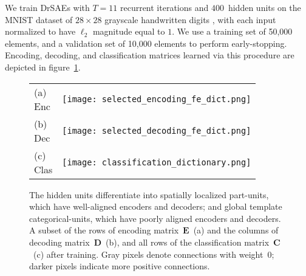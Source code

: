 \documentclass{article} %
\newcommand{\C}{\mathbf{C}}
\newcommand{\D}{\mathbf{D}}
\newcommand{\E}{\mathbf{E}}
\begin{document}
We train DrSAEs with $T=11$ recurrent iterations and $400$~hidden units on the MNIST dataset of $28 \times 28$ grayscale handwritten digits \citep{lecun1998}, with each input normalized to have $\ell_2$ magnitude equal to $1$.  We use a training set of 50,000 elements, and a validation set of 10,000 elements to perform early-stopping.
Encoding, decoding, and classification matrices learned via this procedure are depicted in figure~\ref{dictionary_figure}.

\begin{figure}[tbp]
  \begin{center}
    \begin{tabular}{p{0.10in}p{5.2in}}
      \parbox[b]{0in}{(a) \\ Enc \vspace{0.2cm}} & \texttt{[image: selected\_encoding\_fe\_dict.png]} \\
      \parbox[b]{0in}{(b) \\ Dec \vspace{0.2cm}} & \texttt{[image: selected\_decoding\_fe\_dict.png]} \\
      \parbox[b]{0in}{(c) \\ Clas \vspace{0.2cm}} & \texttt{[image: classification\_dictionary.png]} \\
    \end{tabular}
  \end{center}
  \caption{The hidden units differentiate into spatially localized part-units, which have well-aligned encoders and decoders; and global template categorical-units, which have poorly aligned encoders and decoders.  A subset of the rows of encoding matrix~$\E$~(a) and the columns of decoding matrix~$\D$~(b), and all rows of the classification matrix~$\C$~(c) after training. Gray pixels denote connections with weight~$0$; darker pixels indicate more positive connections.\label{dictionary_figure}} %
\end{figure}


\end{document}
